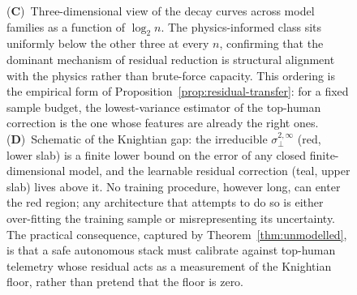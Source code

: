 \begin{figure}[!htbp]
{    (\textbf{C})~Three-dimensional view of the decay curves across model families as a function of $\log_2 n$. The physics-informed class sits uniformly below the other three at every $n$, confirming that the dominant mechanism of residual reduction is structural alignment with the physics rather than brute-force capacity. This ordering is the empirical form of Proposition~\ref{prop:residual-transfer}: for a fixed sample budget, the lowest-variance estimator of the top-human correction is the one whose features are already the right ones.
    (\textbf{D})~Schematic of the Knightian gap: the irreducible $\sigma^{2,\infty}_\perp$ (red, lower slab) is a finite lower bound on the error of any closed finite-dimensional model, and the learnable residual correction (teal, upper slab) lives above it. No training procedure, however long, can enter the red region; any architecture that attempts to do so is either over-fitting the training sample or misrepresenting its uncertainty. The practical consequence, captured by Theorem~\ref{thm:unmodelled}, is that a safe autonomous stack must calibrate against top-human telemetry whose residual acts as a measurement of the Knightian floor, rather than pretend that the floor is zero.}
    \label{fig:panel4}
\end{figure}


